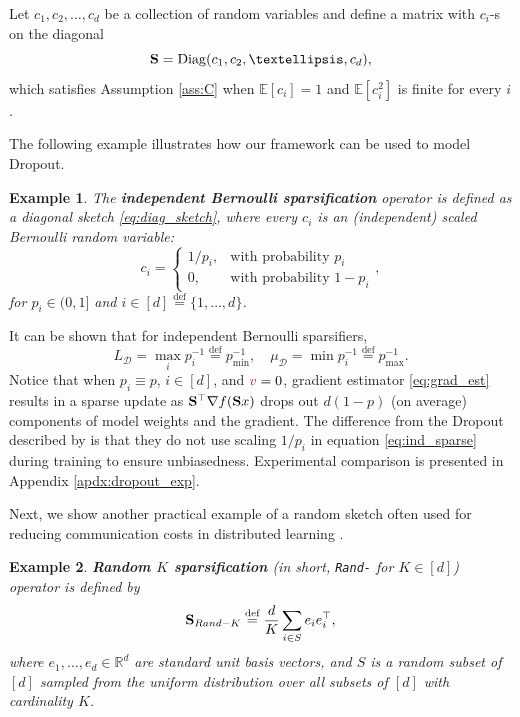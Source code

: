 \documentclass{article}
\newcommand{\rnd}[1]{{\texttt{Rand-}}#1}
\newcommand{\shift}{{\color{purple}s}}
\newcommand{\bb}{\mathbb}
\newcommand{\R}{\bb R}
\newcommand{\eqdef}{\stackrel{\text{def}}{=}}
\newcommand{\Exp}[1]{{\bb E}\left[#1\right]}
\DeclareMathOperator{\Diag}{Diag}
\newtheorem{example}{Example}
\theoremstyle{plain}
\renewcommand{\shift}{{\color{purple}v}}
\newcommand{\mS}{{\bf S}}
\theoremstyle{plain}
\theoremstyle{definition}
\theoremstyle{remark}
\begin{document}
Let $c_1, c_2, \dots, c_d$ be a collection of random variables and define a matrix with $c_i$-s on the diagonal
\begin{equation} \label{eq:diag_sketch}
	\mS = \Diag (c_1, c_2, \dots, c_d),
\end{equation}
which satisfies Assumption \ref{ass:C} when $\Exp{c_i} = 1$ and $\Exp{c_i^2}$ is finite for every $i$.

The following example illustrates how our framework can be used to model Dropout.
\begin{example}
	The \textbf{independent Bernoulli sparsification} operator is defined as a diagonal sketch  \eqref{eq:diag_sketch}, where every $c_i$ is an (independent) scaled Bernoulli random variable:
	\begin{equation} \label{eq:ind_sparse}
		c_i =
		\left\{\begin{array}{ll}
			1/p_i, & \text{with probability }  p_i \\
			0, & \text{with probability }  1-p_i
		\end{array} , \right.
	\end{equation}
	for $p_i \in (0, 1]$ and $i \in [d] \eqdef \{1, \dots, d\}$.
\end{example}

It can be shown that for independent Bernoulli sparsifiers,
\begin{equation}
	L_{\mathcal{D}} = \max_i p_i^{-1} \eqdef p^{-1}_{\min}, \quad \mu_{\mathcal{D}} = \min p_i^{-1} \eqdef p^{-1}_{\max}.
\end{equation}
Notice that when $p_i \equiv p$, $i\in[d]$, and $\shift = 0$, gradient estimator \eqref{eq:grad_est} results in a sparse update as $\mS^\top \nabla f(\mS x)$ drops out $d (1-p)$ (on average) components of model weights and the gradient. The difference from the Dropout described by \cite{hinton2012improving} is that they do not use scaling $1/p_i$ in equation \eqref{eq:ind_sparse} during training to ensure unbiasedness. Experimental comparison is presented in Appendix \ref{apdx:dropout_exp}.

Next, we show another practical example of a random sketch often used for reducing communication costs in distributed learning \citep{konecny2017federated, wangni2018gradient, stich2018sparsified}.
\begin{example}
	\textbf{Random $K$ sparsification} (in short, \rnd{} for $K \in [d]$) operator is defined by
	\begin{equation} \label{eq:rand-k}
		\mS_{\rnd{\text{$K$}}} \eqdef \frac{d}{K} \sum\limits_{i\in S} e_i e_i^\top,
	\end{equation}
	where $e_1, \dots, e_d \in \R^d$ are standard unit basis vectors, and $S$ is a random subset of $[d]$ sampled from the uniform distribution over all subsets of $[d]$ with cardinality $K$.
\end{example}
\end{document}
